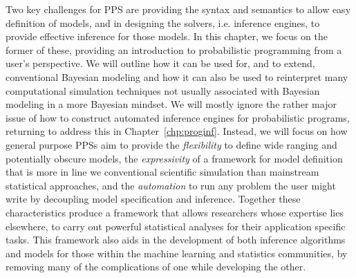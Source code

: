 Two key challenges for PPS are providing the
syntax and semantics to allow easy definition of models, and in designing the solvers, i.e.
inference engines, to provide effective inference for those models.
In this chapter, we focus on the former of these, providing an introduction to 
probabilistic programming from a user's perspective.  We will outline how it can be used for, and
to extend, conventional Bayesian modeling and how it can also be used to reinterpret many computational simulation
techniques not usually associated with Bayesian modeling in a more Bayesian mindset.
We will mostly ignore the rather major issue of how to construct automated inference engines for probabilistic
programs, returning to address this in Chapter~\ref{chp:proginf}.
Instead, we will focus on how general purpose PPSs aim to  provide 
the \emph{flexibility} to define
wide ranging and potentially obscure models, the \emph{expressivity} of a framework for 
model definition that is more in line we conventional scientific simulation than mainstream 
statistical approaches, and the \emph{automation} to  run any problem the user might write
by decoupling model specification and inference.
Together these characteristics produce a framework that allows researchers whose expertise 
lies elsewhere, to carry out powerful statistical analyses for their application specific tasks.  
This framework also aids in the development of both inference
algorithms and models for those within the machine learning and statistics communities,
by removing many of the complications of one while developing the other.
%


